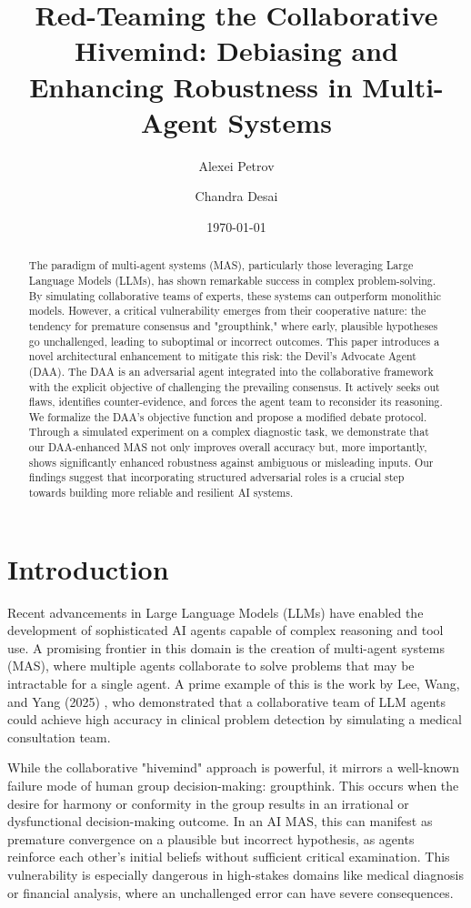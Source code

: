 \documentclass{article}
\title{\textbf{Red-Teaming the Collaborative Hivemind: Debiasing and Enhancing Robustness in Multi-Agent Systems}}
\author[1]{Alexei Petrov}
\author[2]{Chandra Desai}
\affil[1]{Institute for Advanced AI Research}
\affil[2]{Department of Computer Science, Global University}
\date{\today}
\begin{document}
\maketitle

\begin{abstract}
The paradigm of multi-agent systems (MAS), particularly those leveraging Large Language Models (LLMs), has shown remarkable success in complex problem-solving. By simulating collaborative teams of experts, these systems can outperform monolithic models. However, a critical vulnerability emerges from their cooperative nature: the tendency for premature consensus and "groupthink," where early, plausible hypotheses go unchallenged, leading to suboptimal or incorrect outcomes. This paper introduces a novel architectural enhancement to mitigate this risk: the Devil's Advocate Agent (DAA). The DAA is an adversarial agent integrated into the collaborative framework with the explicit objective of challenging the prevailing consensus. It actively seeks out flaws, identifies counter-evidence, and forces the agent team to reconsider its reasoning. We formalize the DAA's objective function and propose a modified debate protocol. Through a simulated experiment on a complex diagnostic task, we demonstrate that our DAA-enhanced MAS not only improves overall accuracy but, more importantly, shows significantly enhanced robustness against ambiguous or misleading inputs. Our findings suggest that incorporating structured adversarial roles is a crucial step towards building more reliable and resilient AI systems.
\end{abstract}

\section{Introduction}

Recent advancements in Large Language Models (LLMs) have enabled the development of sophisticated AI agents capable of complex reasoning and tool use. A promising frontier in this domain is the creation of multi-agent systems (MAS), where multiple agents collaborate to solve problems that may be intractable for a single agent. A prime example of this is the work by Lee, Wang, and Yang (2025) \cite{lee2025automated}, who demonstrated that a collaborative team of LLM agents could achieve high accuracy in clinical problem detection by simulating a medical consultation team.

While the collaborative "hivemind" approach is powerful, it mirrors a well-known failure mode of human group decision-making: groupthink. This occurs when the desire for harmony or conformity in the group results in an irrational or dysfunctional decision-making outcome. In an AI MAS, this can manifest as premature convergence on a plausible but incorrect hypothesis, as agents reinforce each other's initial beliefs without sufficient critical examination. This vulnerability is especially dangerous in high-stakes domains like medical diagnosis or financial analysis, where an unchallenged error can have severe consequences.
\end{document}
